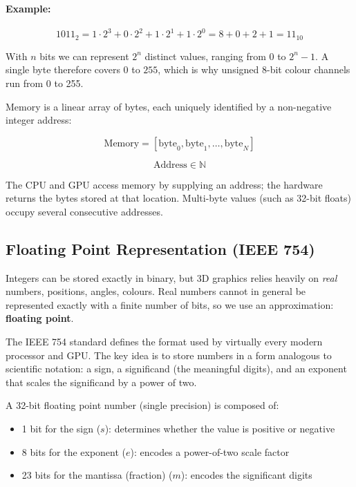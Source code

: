 \documentclass[11pt]{article}
\begin{document}
\paragraph{Example:}
\begin{equation}
    1011_2 = 1 \cdot 2^3 + 0 \cdot 2^2 + 1 \cdot 2^1 + 1 \cdot 2^0 = 8 + 0 + 2 + 1 = 11_{10}
\end{equation}

With $n$ bits we can represent $2^n$ distinct values, ranging from $0$ to $2^n - 1$. A single byte therefore covers $0$ to $255$, which is why unsigned 8-bit colour channels run from 0 to 255.

Memory is a linear array of bytes, each uniquely identified by a non-negative integer address:

\begin{equation}
    \text{Memory} = [\text{byte}_0, \text{byte}_1, \dots, \text{byte}_N]
\end{equation}

\begin{equation}
    \text{Address} \in \mathbb{N}
\end{equation}

The CPU and GPU access memory by supplying an address; the hardware returns the bytes stored at that location. Multi-byte values (such as 32-bit floats) occupy several consecutive addresses.


\subsection{Floating Point Representation (IEEE 754)}

Integers can be stored exactly in binary, but 3D graphics relies heavily on \emph{real} numbers, positions, angles, colours. Real numbers cannot in general be represented exactly with a finite number of bits, so we use an approximation: \textbf{floating point}.

The IEEE 754 standard defines the format used by virtually every modern processor and GPU. The key idea is to store numbers in a form analogous to scientific notation: a sign, a significand (the meaningful digits), and an exponent that scales the significand by a power of two.

A 32-bit floating point number (single precision) is composed of:

\begin{itemize}
    \item 1 bit for the sign ($s$): determines whether the value is positive or negative
    \item 8 bits for the exponent ($e$): encodes a power-of-two scale factor
    \item 23 bits for the mantissa (fraction) ($m$): encodes the significant digits
\end{itemize}
\end{document}
